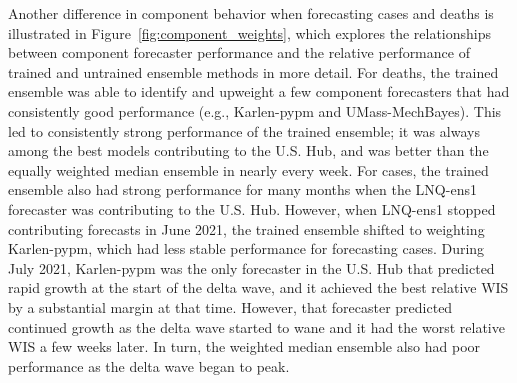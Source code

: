 \documentclass[11pt,3p,review,authoryear]{elsarticle}
\begin{document}
Another difference in component behavior when forecasting cases and deaths is illustrated in Figure~\ref{fig:component_weights}, which explores the relationships between component forecaster performance and the relative performance of trained and untrained ensemble methods in more detail.
For deaths, the trained ensemble was able to identify and upweight a few component forecasters that had consistently good performance (e.g., Karlen-pypm and UMass-MechBayes).
This led to consistently strong performance of the trained ensemble; it was always among the best models contributing to the U.S. Hub, and was better than the equally weighted median ensemble in nearly every week.
For cases, the trained ensemble also had strong performance for many months when the LNQ-ens1 forecaster was contributing to the U.S. Hub.
However, when LNQ-ens1 stopped contributing forecasts in June 2021, the trained ensemble shifted to weighting Karlen-pypm, which had less stable performance for forecasting cases.
During July 2021, Karlen-pypm was the only forecaster in the U.S. Hub that predicted rapid growth at the start of the delta wave, and it achieved the best relative WIS by a substantial margin at that time. However, that forecaster predicted continued growth as the delta wave started to wane and it had the worst relative WIS a few weeks later.
In turn, the weighted median ensemble also had poor performance as the delta wave began to peak.
\end{document}
